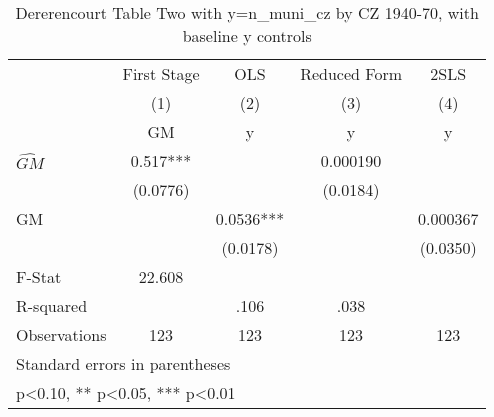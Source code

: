 \begin{table}[htbp]\centering
\def\sym#1{\ifmmode^{#1}\else\(^{#1}\)\fi}
\caption{Dererencourt Table Two with y=n\_muni\_cz by CZ 1940-70, with baseline y controls}
\begin{tabular}{l*{4}{c}}
\toprule
                    & First Stage   &         OLS   &Reduced Form   &        2SLS   \\
                    &\multicolumn{1}{c}{(1)}&\multicolumn{1}{c}{(2)}&\multicolumn{1}{c}{(3)}&\multicolumn{1}{c}{(4)}\\
                    &\multicolumn{1}{c}{GM}&\multicolumn{1}{c}{y}&\multicolumn{1}{c}{y}&\multicolumn{1}{c}{y}\\
\midrule
$\hat{GM}$          &       0.517***&               &    0.000190   &               \\
                    &    (0.0776)   &               &    (0.0184)   &               \\
\addlinespace
GM                  &               &      0.0536***&               &    0.000367   \\
                    &               &    (0.0178)   &               &    (0.0350)   \\
\midrule
F-Stat              &      22.608   &               &               &               \\
R-squared           &               &        .106   &        .038   &               \\
Observations        &         123   &         123   &         123   &         123   \\
\bottomrule
\multicolumn{5}{l}{\footnotesize Standard errors in parentheses}\\
\multicolumn{5}{l}{\footnotesize * p<0.10, ** p<0.05, *** p<0.01}\\
\end{tabular}
\end{table}
